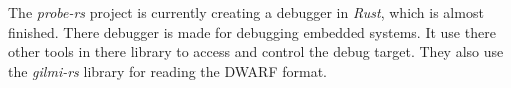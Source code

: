 
The \emph{probe-rs} project is currently creating a debugger in \emph{Rust}, which is almost finished.
There debugger is made for debugging embedded systems.
It use there other tools in there library to access and control the debug target.
They also use the \emph{gilmi-rs} library for reading the \gls{DWARF} format.


